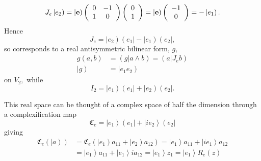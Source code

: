 \documentclass[aps,preprint]{revtex4}%
\begin{document}
\begin{equation}
J_{e}\left\vert e_{2}\right)  =\left\vert \mathbf{e}\right)  \left(
\begin{array}
[c]{cc}%
0 & -1\\
1 & 0
\end{array}
\right)  \left(
\begin{array}
[c]{c}%
0\\
1
\end{array}
\right)  =\left\vert \mathbf{e}\right)  \left(
\begin{array}
[c]{c}%
-1\\
0
\end{array}
\right)  =-\left\vert e_{1}\right)  .
\end{equation}
Hence
\begin{equation}
J_{e}=\left\vert e_{2}\right)  \left(  e_{1}\right\vert -\left\vert
e_{1}\right)  \left(  e_{2}\right\vert ,
\end{equation}
so corresponds to a real antisymmetric bilinear form, $g,$%
\begin{align}
g\left(  a,b\right)   &  =\left(  \left.  g\right\vert a\wedge b\right)
=\left(  \left.  a\right\vert J_{e}b\right) \\
\left\vert g\right)   &  =\left\vert e_{1}e_{2}\right)
\end{align}
on $V_{2},$ while
\begin{equation}
I_{2}=\left\vert e_{1}\right)  \left(  e_{1}\right\vert +\left\vert
e_{2}\right)  \left(  e_{2}\right\vert .
\end{equation}


This real space can be thought of a complex space of half the dimension
through a complexification map
\begin{equation}
\mathfrak{C}_{e}=\left\vert e_{1}\right\rangle \left(  e_{1}\right\vert
+\left\vert ie_{2}\right\rangle \left(  e_{2}\right\vert
\end{equation}
giving%
\begin{align}
\mathfrak{C}_{e}\left(  \left\vert a\right)  \right)   &  =\mathfrak{C}%
_{e}\left(  \left\vert e_{1}\right)  a_{11}+\left\vert e_{2}\right)
a_{12}\right)  =\left\vert e_{1}\right\rangle a_{11}+\left\vert ie_{1}%
\right\rangle a_{12}\\
&  =\left\vert e_{1}\right\rangle a_{11}+\left\vert e_{1}\right\rangle
ia_{12}=\left\vert e_{1}\right\rangle z_{1}=\left\vert e_{1}\right\rangle
R_{e}\left(  z\right)
\end{align}
\end{document}
